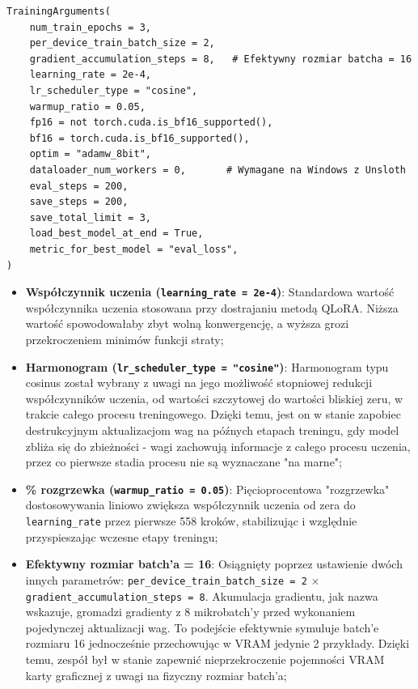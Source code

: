 \documentclass[12pt,a4paper]{article}
\begin{document}
\begin{tcolorbox}
\begin{verbatim}
TrainingArguments(
    num_train_epochs = 3,
    per_device_train_batch_size = 2,
    gradient_accumulation_steps = 8,   # Efektywny rozmiar batcha = 16
    learning_rate = 2e-4,
    lr_scheduler_type = "cosine",
    warmup_ratio = 0.05,
    fp16 = not torch.cuda.is_bf16_supported(),
    bf16 = torch.cuda.is_bf16_supported(),
    optim = "adamw_8bit",
    dataloader_num_workers = 0,       # Wymagane na Windows z Unsloth
    eval_steps = 200,
    save_steps = 200,
    save_total_limit = 3,
    load_best_model_at_end = True,
    metric_for_best_model = "eval_loss",
)
\end{verbatim}
\end{tcolorbox}

\begin{itemize}
    \item \textbf{Współczynnik uczenia (\texttt{learning\_rate = 2e-4})}: Standardowa wartość współczynnika uczenia stosowana przy dostrajaniu metodą QLoRA. 
            Niższa wartość spowodowałaby zbyt wolną konwergencję, a wyższa grozi przekroczeniem minimów funkcji straty;

    \item \textbf{Harmonogram (\texttt{lr\_scheduler\_type = "cosine"})}: 
            Harmonogram typu cosinus został wybrany z uwagi na jego możliwość stopniowej redukcji współczynników uczenia, od wartości szczytowej do wartości bliskiej
            zeru, w trakcie całego procesu treningowego. Dzięki temu, jest on w stanie zapobiec destrukcyjnym aktualizacjom wag na późnych etapach treningu, 
            gdy model zbliża się do zbieżności - wagi zachowują informacje z całego procesu uczenia, przez co pierwsze stadia procesu nie są wyznaczane "na marne";

    \item \textbf{\% rozgrzewka (\texttt{warmup\_ratio = 0.05})}: Pięcioprocentowa "rozgrzewka" dostosowywania liniowo zwiększa współczynnik uczenia od zera 
            do \texttt{learning\_rate} przez pierwsze 558 kroków, stabilizując i względnie przyspieszając wczesne etapy treningu;

    \item \textbf{Efektywny rozmiar batch'a = 16}: Osiągnięty poprzez ustawienie dwóch innych parametrów:  
            \texttt{per\_device\_train\_batch\_size = 2} $\times$ \texttt{gradient\_accumulation\_steps = 8}. Akumulacja gradientu, jak nazwa wskazuje, gromadzi gradienty 
            z 8 mikrobatch'y przed wykonaniem pojedynczej aktualizacji wag. To podejście efektywnie symuluje batch'e rozmiaru 16 jednocześnie przechowując w VRAM jedynie 2 przykłady.
            Dzięki temu, zespół był w stanie zapewnić nieprzekroczenie pojemności VRAM karty graficznej z uwagi na fizyczny rozmiar batch'a;


\end{itemize}
\end{document}
